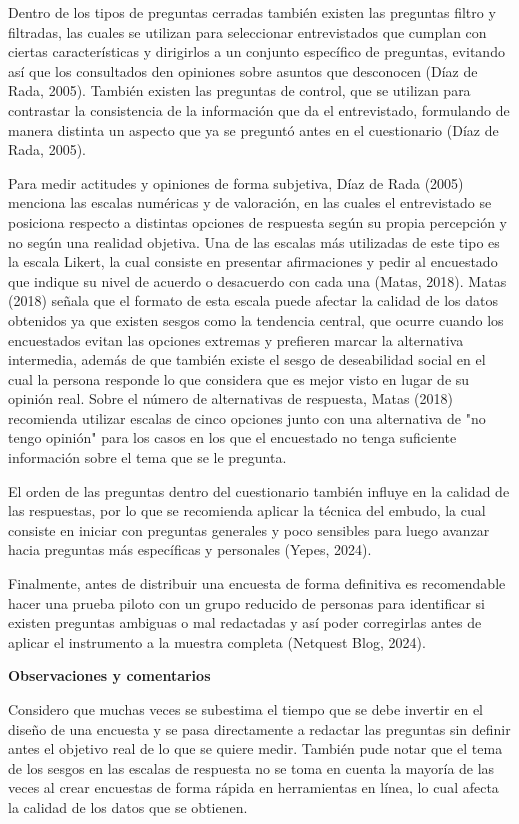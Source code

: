 \documentclass[12pt,letterpaper]{article}
\newcommand{\subtitulo}[1]{\noindent\textbf{#1}\par\vspace{2pt}}
\begin{document}
Dentro de los tipos de preguntas cerradas también existen las preguntas filtro y filtradas, las cuales se utilizan para seleccionar entrevistados que cumplan con ciertas características y dirigirlos a un conjunto específico de preguntas, evitando así que los consultados den opiniones sobre asuntos que desconocen (Díaz de Rada, 2005). También existen las preguntas de control, que se utilizan para contrastar la consistencia de la información que da el entrevistado, formulando de manera distinta un aspecto que ya se preguntó antes en el cuestionario (Díaz de Rada, 2005).

Para medir actitudes y opiniones de forma subjetiva, Díaz de Rada (2005) menciona las escalas numéricas y de valoración, en las cuales el entrevistado se posiciona respecto a distintas opciones de respuesta según su propia percepción y no según una realidad objetiva. Una de las escalas más utilizadas de este tipo es la escala Likert, la cual consiste en presentar afirmaciones y pedir al encuestado que indique su nivel de acuerdo o desacuerdo con cada una (Matas, 2018). Matas (2018) señala que el formato de esta escala puede afectar la calidad de los datos obtenidos ya que existen sesgos como la tendencia central, que ocurre cuando los encuestados evitan las opciones extremas y prefieren marcar la alternativa intermedia, además de que también existe el sesgo de deseabilidad social en el cual la persona responde lo que considera que es mejor visto en lugar de su opinión real. Sobre el número de alternativas de respuesta, Matas (2018) recomienda utilizar escalas de cinco opciones junto con una alternativa de "no tengo opinión" para los casos en los que el encuestado no tenga suficiente información sobre el tema que se le pregunta.

El orden de las preguntas dentro del cuestionario también influye en la calidad de las respuestas, por lo que se recomienda aplicar la técnica del embudo, la cual consiste en iniciar con preguntas generales y poco sensibles para luego avanzar hacia preguntas más específicas y personales (Yepes, 2024).

Finalmente, antes de distribuir una encuesta de forma definitiva es recomendable hacer una prueba piloto con un grupo reducido de personas para identificar si existen preguntas ambiguas o mal redactadas y así poder corregirlas antes de aplicar el instrumento a la muestra completa (Netquest Blog, 2024).

\subtitulo{Observaciones y comentarios}
Considero que muchas veces se subestima el tiempo que se debe invertir en el diseño de una encuesta y se pasa directamente a redactar las preguntas sin definir antes el objetivo real de lo que se quiere medir. También pude notar que el tema de los sesgos en las escalas de respuesta no se toma en cuenta la mayoría de las veces al crear encuestas de forma rápida en herramientas en línea, lo cual afecta la calidad de los datos que se obtienen.
\end{document}
